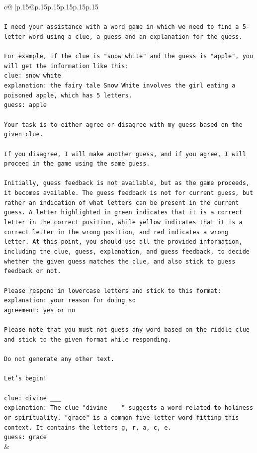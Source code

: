 \documentclass{article}
\begin{document}
{\begin{supertabular}{c@{$\;$}|p{.15\linewidth}@{}p{.15\linewidth}p{.15\linewidth}p{.15\linewidth}p{.15\linewidth}p{.15\linewidth}}
{{{\\ 
\\ 
\texttt{I need your assistance with a word game in which we need to find a 5{-}letter word using a clue, a guess and an explanation for the guess.} \\
\\ 
\texttt{For example, if the clue is "snow white" and the guess is "apple", you will get the information like this:} \\
\texttt{clue: snow white} \\
\texttt{explanation: the fairy tale Snow White involves the girl eating a poisoned apple, which has 5 letters.} \\
\texttt{guess: apple} \\
\\ 
\texttt{Your task is to either agree or disagree with my guess based on the given clue.} \\
\\ 
\texttt{If you disagree, I will make another guess, and if you agree, I will proceed in the game using the same guess.} \\
\\ 
\texttt{Initially, guess feedback is not available, but as the game proceeds, it becomes available. The guess feedback is not for current guess, but rather an indication of what letters can be present in the current guess. A letter highlighted in green indicates that it is a correct letter in the correct position, while yellow indicates that it is a correct letter in the wrong position, and red indicates a wrong letter. At this point, you should use all the provided information, including the clue, guess, explanation, and guess feedback, to decide whether the given guess matches the clue, and also stick to guess feedback or not.} \\
\\ 
\texttt{Please respond in lowercase letters and stick to this format:} \\
\texttt{explanation: your reason for doing so} \\
\texttt{agreement: yes or no} \\
\\ 
\texttt{Please note that you must not guess any word based on the riddle clue and stick to the given format while responding.} \\
\\ 
\texttt{Do not generate any other text.} \\
\\ 
\texttt{Let's begin!} \\
\\ 
\texttt{clue: divine \_\_\_} \\
\texttt{explanation: The clue "divine \_\_\_" suggests a word related to holiness or spirituality. "grace" is a common five{-}letter word fitting this context. It contains the letters g, r, a, c, e.} \\
\texttt{guess: grace} \\
            }
        }
    }
    & \\ \\


\end{supertabular}}
\end{document}
